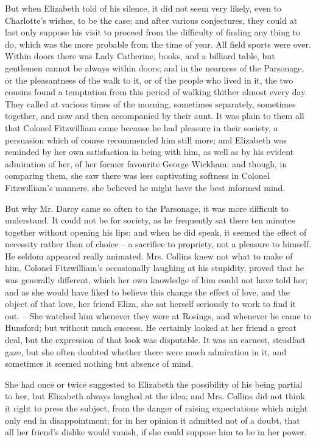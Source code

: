 But when Elizabeth told of his silence, it did not seem
very likely, even to Charlotte’s wishes, to be the case;
and after various conjectures, they could at last only
suppose his visit to proceed from the difficulty of finding
any thing to do, which was the more probable from the
time of year. All field sports were over. Within doors
there was Lady Catherine, books, and a billiard table,
but gentlemen cannot be always within doors; and in
the nearness of the Parsonage, or the pleasantness of the
walk to it, or of the people who lived in it, the two cousins
found a temptation from this period of walking thither
almost every day. They called at various times of the
morning, sometimes separately, sometimes together, and
now and then accompanied by their aunt. It was plain
to them all that Colonel Fitzwilliam came because he had
pleasure in their society, a persuasion which of course
recommended him still more; and Elizabeth was reminded
by her own satisfaction in being with him, as well as by
his evident admiration of her, of her former favourite
George Wickham; and though, in comparing them, she
saw there was less captivating softness in Colonel Fitzwilliam’s
manners, she believed he might have the best
informed mind.

But why Mr. Darcy came so often to the Parsonage,
it was more difficult to understand. It could not be for
society, as he frequently sat there ten minutes together
without opening his lips; and when he did speak, it
seemed the effect of necessity rather than of choice -- a
sacrifice to propriety, not a pleasure to himself. He
seldom appeared really animated. Mrs. Collins knew not
what to make of him. Colonel Fitzwilliam’s occasionally
laughing at his stupidity, proved that he was generally
different, which her own knowledge of him could not
have told her; and as she would have liked to believe
this change the effect of love, and the object of that love,
her friend Eliza, she sat herself seriously to work to find
it out. -- She watched him whenever they were at Rosings,
and whenever he came to Hunsford; but without much
success. He certainly looked at her friend a great deal,
but the expression of that look was disputable. It was
an earnest, steadfast gaze, but she often doubted whether
there were much admiration in it, and sometimes it seemed
nothing but absence of mind.

She had once or twice suggested to Elizabeth the
possibility of his being partial to her, but Elizabeth
always laughed at the idea; and Mrs. Collins did not
think it right to press the subject, from the danger of
raising expectations which might only end in disappointment;
for in her opinion it admitted not of a doubt,
that all her friend’s dislike would vanish, if she could
suppose him to be in her power.

